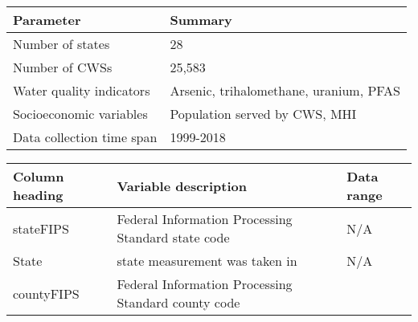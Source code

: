 \documentclass[12pt,]{article}
\begin{document}
\begin{longtable}[]{@{}ll@{}}
\toprule
\textbf{Parameter} & \textbf{Summary}\tabularnewline
\midrule
\endhead
Number of states & 28\tabularnewline
Number of CWSs & 25,583\tabularnewline
Water quality indicators & Arsenic, trihalomethane, uranium,
PFAS\tabularnewline
Socioeconomic variables & Population served by CWS, MHI\tabularnewline
Data collection time span & 1999-2018\tabularnewline
\bottomrule
\end{longtable}

\begin{longtable}[]{@{}lll@{}}
\toprule
\begin{minipage}[b]{0.22\columnwidth}\raggedright
\textbf{Column heading}\strut
\end{minipage} & \begin{minipage}[b]{0.46\columnwidth}\raggedright
\textbf{Variable description}\strut
\end{minipage} & \begin{minipage}[b]{0.23\columnwidth}\raggedright
\textbf{Data range}\strut
\end{minipage}\tabularnewline
\midrule
\endhead
\begin{minipage}[t]{0.22\columnwidth}\raggedright
stateFIPS\strut
\end{minipage} & \begin{minipage}[t]{0.46\columnwidth}\raggedright
Federal Information Processing Standard state code\strut
\end{minipage} & \begin{minipage}[t]{0.23\columnwidth}\raggedright
N/A\strut
\end{minipage}\tabularnewline
\begin{minipage}[t]{0.22\columnwidth}\raggedright
State\strut
\end{minipage} & \begin{minipage}[t]{0.46\columnwidth}\raggedright
state measurement was taken in\strut
\end{minipage} & \begin{minipage}[t]{0.23\columnwidth}\raggedright
N/A\strut
\end{minipage}\tabularnewline
\begin{minipage}[t]{0.22\columnwidth}\raggedright
countyFIPS\strut
\end{minipage} & \begin{minipage}[t]{0.46\columnwidth}\raggedright
Federal Information Processing Standard county code\strut
\end{minipage} & \begin{minipage}[t]{0.23\columnwidth}\raggedright

\end{minipage}
\end{longtable}
\end{document}
